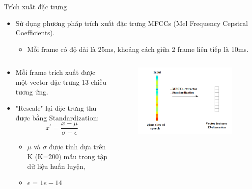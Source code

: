 \documentclass[10pt,a4paper,openany]{beamer}
\begin{document}
	\begin{frame}{Trích xuất đặc trưng} \pause
		\begin{itemize}
			\item Sử dụng phương pháp trích xuất đặc trưng MFCCs (Mel Frequency Cepstral Coefficients).  \pause
			\begin{itemize}
				\item Mỗi frame có độ dài là 25ms, khoảng cách giữa 2 frame liên tiếp là 10ms. \pause
			\end{itemize}
			
		\end{itemize}
		\begin{columns}
			\begin{column}{0.5\textwidth}
				\begin{itemize}
					\item Mỗi frame trích xuất được một vector đặc trưng-13 chiều tương ứng. \pause
					\item "Rescale" lại đặc trưng thu được bằng Standardization:
					\[
					x^{'} = \frac{x - \mu}{\sigma + \epsilon}
					\]   \pause
					\begin{itemize}
						\item $\mu$ và $\sigma$ được tính dựa trên K (K=200) mẫu trong tập dữ liệu huấn luyện,
						\item $\epsilon$ = $1e-14$
					\end{itemize} \pause
				\end{itemize}
			\end{column}
			\begin{column}{0.5\textwidth}
				\begin{figure}[htbp]
					\centerline{\includegraphics[scale=0.45]{charts/features_extract.png}}

\end{figure}
\end{column}
\end{columns}
\end{frame}
\end{document}
